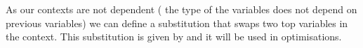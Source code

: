 \begin{code}[hide]
\AgdaSymbol{:}\AgdaSpace{}%
\AgdaSpace{}%
\AgdaSpace{}%
\AgdaSpace{}%
\AgdaSpace{}%
\AgdaSpace{}%
\AgdaSpace{}%
\AgdaSpace{}%
\AgdaSpace{}%
\AgdaSpace{}%
\AgdaSpace{}%
\<%
\\
%
\>[2]\AgdaSpace{}%
\AgdaSpace{}%
\AgdaSpace{}%
\AgdaSymbol{=}\AgdaSpace{}%
\<%
\\
%
\>[2]\AgdaSymbol{(}\AgdaSpace{}%
\AgdaSpace{}%
\AgdaSymbol{)}\AgdaSpace{}%
\AgdaSpace{}%
\AgdaSpace{}%
\AgdaSymbol{=}\AgdaSpace{}%
\AgdaSymbol{(}\AgdaSpace{}%
\AgdaSpace{}%
\AgdaSymbol{)}\AgdaSpace{}%
\AgdaSpace{}%
\AgdaSpace{}%
\AgdaSpace{}%
\<%
\end{code}
As our contexts are not dependent (\eg{} the type of the variables does not
depend on previous variables) we can define a substitution that swaps two top
variables in the context.  This substitution is given by  and it
will be used in optimisations.
\begin{mathpar}
\end{mathpar}


